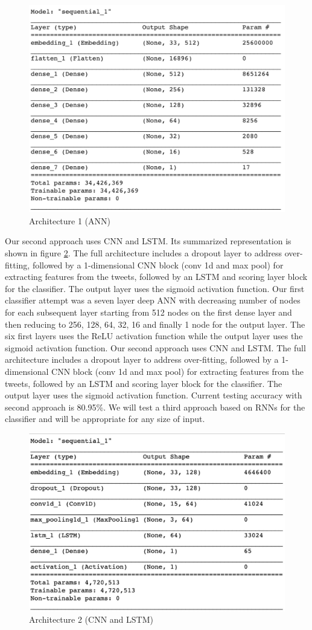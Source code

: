 \documentclass[conference]{sig-alternate-05-2015}
\begin{document}
\begin{figure}
	\centering
	\includegraphics[width=0.8\linewidth]{"Model_ANN"}
	\caption{Architecture 1 (ANN)}
	\label{fig:model ANN}
\end{figure}

Our second approach uses CNN and LSTM. Its summarized representation is shown in figure \ref{fig:model CNN LSTM}. The full architecture includes a dropout layer to address over-fitting, followed by a 1-dimensional CNN block (conv 1d and max pool) for extracting features from the tweets, followed by an LSTM and scoring layer block for the classifier. The output layer uses the sigmoid activation function.
Our first classifier attempt was a seven layer deep ANN with decreasing number of nodes for each subsequent layer starting from 512 nodes on the first dense layer and then reducing to 256, 128, 64, 32, 16 and finally 1 node for the output layer. The six first layers uses the ReLU activation function while the output layer uses the sigmoid activation function.
Our second approach uses CNN and LSTM. The full architecture includes a dropout layer to address over-fitting, followed by a 1-dimensional CNN block (conv 1d and max pool) for extracting features from the tweets, followed by an LSTM and scoring layer block for the classifier. The output layer uses the sigmoid activation function. Current testing accuracy with second approach is 80.95\%.
We will test a third approach based on RNNs for the classifier and will be appropriate for any size of input.
\begin{figure}
	\centering
	\includegraphics[width=0.8\linewidth]{"Model_CNN_LSTM"}
	\caption{Architecture 2 (CNN and LSTM)}
	\label{fig:model CNN LSTM}
\end{figure}
\end{document}
